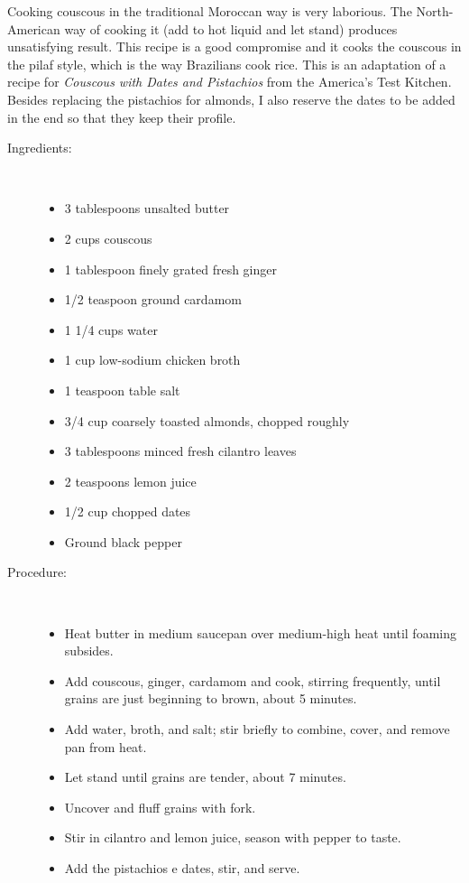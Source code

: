 \documentclass[11pt,letterpaper]{article}
\begin{document}


Cooking couscous in the traditional Moroccan way is very laborious. The North-American way of cooking it (add to hot liquid and let stand) produces unsatisfying result. This recipe is a good compromise and it cooks the couscous in the pilaf style, which is the way Brazilians cook rice.
This is an adaptation of a recipe for {\it Couscous with Dates and Pistachios} from the America's Test Kitchen. Besides replacing the pistachios for almonds, I also reserve the dates to be added in the end so that they keep their profile.

\begin{description}

\item[Ingredients:]\ \\
	\begin{itemize}
	\item 3 tablespoons unsalted butter
	\item 2 cups couscous
	\item 1 tablespoon finely grated fresh ginger
	\item 1/2 teaspoon ground cardamom
	\item 1 1/4 cups water
	\item 1 cup low-sodium chicken broth
	\item 1 teaspoon table salt
	\item 3/4 cup coarsely toasted almonds, chopped roughly
	\item 3 tablespoons minced fresh cilantro leaves
	\item 2 teaspoons lemon juice
	\item 1/2 cup chopped dates
	\item Ground black pepper
	\end{itemize}

\item[Procedure:]\ \\
	\begin{itemize}
	\item Heat butter in medium saucepan over medium-high heat until foaming subsides.
	\item Add couscous, ginger, cardamom and cook, stirring frequently, until grains are just beginning to brown, about 5 minutes. 
	\item Add water, broth, and salt; stir briefly to combine, cover, and remove pan from heat. 
	\item Let stand until grains are tender, about 7 minutes. 
	\item Uncover and fluff grains with fork. 
	\item Stir in cilantro and lemon juice, season with pepper to taste.
	\item Add the pistachios e dates, stir, and serve.
	\end{itemize}
\end{description}
\end{document}
